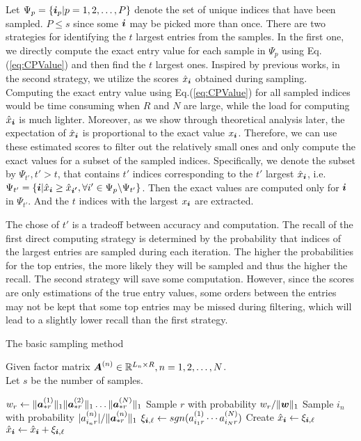 \documentclass[letterpaper]{article}
\newcommand{\Sca}[3]{{#1}^{(#2)}_{i_#2#3}}%
\newcommand{\anr}[2]{\Sca{a}{#1}{#2}}
\newcommand{\score}[1]{\xi_{\V{i},#1}}
\newcommand{\V}[1]{{\boldsymbol{{\MakeLowercase{#1}}}}}
\newcommand{\ColVec}[3]{\V{#1}^{(#2)}_{#3}}
\newcommand{\NormColA}[2]{\norm{\ColVec{a}{#1}{*#2}}{1}}
\newcommand{\ColVecA}[1]{\V{a}^{(#1)}_{*r}}
\newcommand{\coord}{(i_1,i_2,\ldots,i_N)}
\newcommand{\predx}{\hat{x}_{\V{i}}}
\newcommand{\M}[1]{{\boldsymbol{{\MakeUppercase{#1}}}}}
\newcommand{\FacMat}[2]{\M{#1}^{(#2)}}
\newcommand{\norm}[2]{\|#1\|_{#2}}
\newcommand{\Eqn}[1]{Eq.(\ref{eq:#1})}
\begin{document}
Let $\Psi_p = \{\V{i}_p|p = 1,2,\ldots,P\}$
denote the set of unique indices that have been sampled.
$P\leq s$ since some $\V{i}$ may be picked more than once.
There are two strategies for identifying the $t$ largest entries from the samples.
In the first one,
we directly compute the exact entry value for each sample in $\Psi_{p}$ using \Eqn{CPValue}
and then find the $t$ largest ones.
Inspired by previous works, in the second strategy,
we utilize the scores $\predx$ obtained during sampling.
Computing the exact entry value using \Eqn{CPValue} for all sampled indices
would be time consuming when $R$ and $N$ are large,
while the load for computing $\predx$ is much lighter.
Moreover, as we show through theoretical analysis later,
the expectation of $\predx$ is proportional to the exact value $x_{\V{i}}$.
Therefore, we can use these estimated scores to filter out the relatively small ones
and only compute the exact values for a subset of the sampled indices.
Specifically, we denote the subset by $\Psi_{t'},t'>t$,
that contains $t'$ indices corresponding to the $t'$ largest $\predx$, i.e.
$
    \Psi_{t'} = \{ \V{i} | \predx \geq \hat{x}_{\V{i'}},
                           \forall i'\in \Psi_{p} \backslash \Psi_{t'}
                \}
$.
Then the exact values  are computed only for $\V{i}$ in $\Psi_{t'}$.
And the $t$ indices with the largest $x_{\V{i}}$ are extracted.

The chose of $t'$ is a tradeoff between accuracy and computation.
The recall of the first direct computing strategy is determined by the probability
that indices of the largest entries are sampled during each iteration.
The higher the probabilities for the top entries, the more likely they will be sampled
and thus the higher the recall.
The second strategy will save some computation.
However, since the scores are only estimations of the true entry values,
some orders between the entries may not be kept
that some top entries may be missed during filtering,
which will lead to a slightly lower recall than the first strategy.

\begin{algorithm}[!ht]
    \caption{The basic sampling method}
    \label{alg:CoreSampling}
    Given factor matrix $\FacMat{A}{n}\in \mathbb{R}^{L_n\times R}, n = 1,2,\ldots,N$.\\
    Let $s$ be the number of samples.
    \begin{algorithmic}[1]
    \State $w_r \leftarrow \NormColA{1}{r}\NormColA{2}{r}\ldots\NormColA{N}{r}$
    \label{line:Weight}
    \EndFor
    \State Sample $r$ with probability $w_r/\norm{\V{W}}{1}$
    \label{line:CorePartition}
    \label{line:ItemPartitionFor}
    \State Sample $i_n$ with probability $|\anr{n}{r}|/\norm{\ColVecA{n}}{1}$
    \EndFor
    \label{line:ItemPartitionEnd}
    \State
    \label{line:Scoring}
        $\score{\ell} \leftarrow sgn(\anr{1}{r}\cdots\anr{N}{r})$
    \If {$\V{i}=\coord$ has not been sampled}
    \State  Create $\predx \leftarrow \score{\ell} $
    \Else
    \State $\predx \leftarrow \predx + \score{\ell}$
    \EndIf
    \EndFor
    \label{line:ScoringEnd}
    \end{algorithmic}
\end{algorithm}
\end{document}

